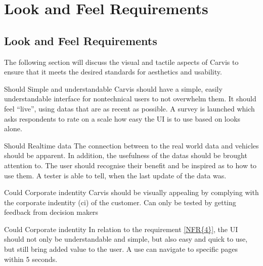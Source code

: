 \chapter{Look and Feel Requirements}
\label{sec:lookandfeel}

\section{Look and Feel Requirements}

The following section will discuss the visual and tactile aspects of Carvis to ensure that it meets the desired standards for aesthetics and usability.
\label{sec:appearancerequirements}

{Should}
{Simple and understandable}
{Carvis should have a simple, easily understandable interface for \gls{nontechnical} users to not overwhelm them. It should feel \enquote{live}, using \glspl{data} that are as recent as possible.}
{A survey is launched which asks respondents to rate on a scale how easy the UI is to use based on looks alone.}

{Should}
{Realtime data}
{The connection between to the real world data and vehicles should be apparent. In addition, the usefulness of the \glspl{data} should be brought attention to. The user should recognise their benefit and be inspired as to how to use them.}
{A tester is able to tell, when the last update of the data was.}

{Could}
{Corporate indentity}
{Carvis should be visually appealing by complying with the corporate indentity (\gls{ci}) of the customer.}
{Can only be tested by getting feedback from decision makers}

{Could}
{Corporate indentity}
{In relation to the requirement \autoref{NFR{4}}, the UI should not only be understandable and simple, but also easy and quick to use, but still bring added value to the user.}
{A use can navigate to specific pages within 5 seconds.}
